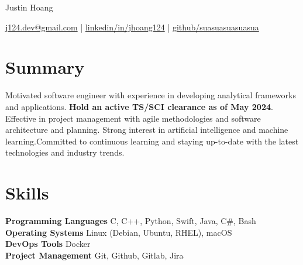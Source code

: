 \documentclass[11pt]{article}       %
\begin{document}
\centerline{\Huge Justin Hoang}

\vspace{5pt}

\centerline{\href{mailto:j124.dev@gmail.com}{j124.dev@gmail.com}
  | \href{https://www.linkedin.com/in/jhoang124/}{linkedin/in/jhoang124}
  | \href{https://github.com/suasuasuasuasua}{github/suasuasuasuasua}}

\vspace{-10pt}

\section*{Summary}
Motivated software engineer with experience in developing analytical frameworks
and applications. \textbf{Hold an active TS/SCI clearance as of May 2024}.
Effective in project management with agile methodologies and software
architecture and planning. Strong interest in artificial intelligence and
machine learning.Committed to continuous learning and staying up-to-date with
the latest technologies and industry trends.
\vspace{-6.5pt}

\section*{Skills}
\textbf{Programming Languages} C, C++, Python, Swift, Java, C\#, Bash \\
\textbf{Operating Systems} Linux (Debian, Ubuntu, RHEL), macOS \\
\textbf{DevOps Tools} Docker \\
\textbf{Project Management} Git, Github, Gitlab, Jira \\

\vspace{-6.5pt}
\end{document}
